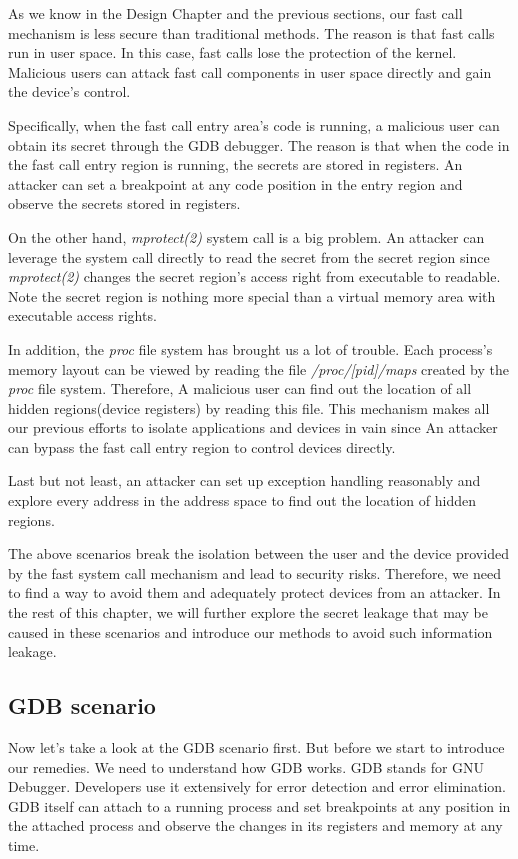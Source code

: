 As we know in the Design Chapter and the previous sections, our fast call 
mechanism is less secure than traditional methods. The reason is that fast 
calls run in user space. In this case, fast calls lose the protection of the kernel. Malicious users can attack fast call components in user space directly and gain the device's control.


Specifically, when the fast call entry area's code is running, a malicious 
user can obtain its secret through the GDB debugger. The reason is that when 
the code in the fast call entry region is running, the secrets are stored in 
registers. An attacker can set a breakpoint at any code position in the entry
 region and observe the secrets stored in registers.

On the other hand, \emph{mprotect(2)} system call is a big problem. An attacker 
can leverage the system call directly to read the secret from the secret 
region since \emph{mprotect(2)} changes the secret region's access right from 
executable to readable.  Note the secret region is nothing more special 
than a virtual memory area with executable access rights. 

In addition, the \emph{proc} file system has brought us a lot of trouble. 
Each process's memory layout can be viewed by reading the file \emph{/proc/[pid]/maps} 
created by the \emph{proc} file system. Therefore,  A malicious user can find out the 
location of all hidden regions(device registers) by reading this file. This 
mechanism makes all our previous efforts to isolate applications and devices 
in vain since An attacker can bypass the fast call entry region to control 
devices directly.  

Last but not least, an attacker can set up exception handling reasonably and 
explore every address in the address space to find out the location of hidden 
regions. 

The above scenarios break the isolation between the user and the device 
provided by the fast system call mechanism and lead to security risks. 
Therefore, we need to find a way to avoid them and adequately protect 
devices from an attacker. In the rest of this chapter, we will further 
explore the secret leakage that may be caused in these scenarios and 
introduce our methods to avoid such information leakage.

\subsection{GDB scenario}
Now let's take a look at the GDB scenario first. 
But before we start to introduce our remedies. We need to understand 
how GDB works. GDB stands for GNU Debugger. Developers use it extensively for error 
detection and error elimination. GDB itself can attach to a running 
process and set breakpoints at any position in the attached process 
and observe the changes in its registers and memory at any time. 


